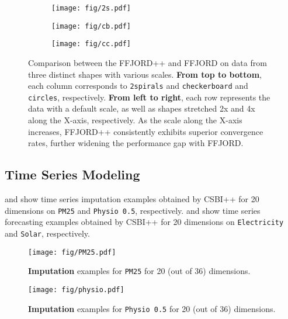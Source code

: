 \begin{figure}[!t]
    \centering
    \begin{subfigure}[b]{0.9\textwidth}
        \centering
        \texttt{[image: fig/2s.pdf]}
    \end{subfigure}
    \begin{subfigure}[b]{0.9\textwidth}
        \centering
        \texttt{[image: fig/cb.pdf]}
    \end{subfigure}
    \begin{subfigure}[b]{0.9\textwidth}
        \centering
        \texttt{[image: fig/cc.pdf]}
    \end{subfigure}

    \caption{\small Comparison between the FFJORD++ and FFJORD on data from three distinct shapes with various scales. \textbf{From top to bottom}, each column corresponds to \texttt{2spirals} and \texttt{checkerboard} and \texttt{circles}, respectively. \textbf{From left to right}, each row represents the data with a default scale, as well as shapes stretched 2x and 4x along the X-axis, respectively. As the scale along the X-axis increases, FFJORD++ consistently exhibits superior convergence rates, further widening the performance gap with FFJORD.}

    \label{fig: ap_condition_num}
\end{figure}

\subsection{Time Series Modeling}
 and  show time series imputation examples obtained by CSBI++ for 20 dimensions on \texttt{PM25} and \texttt{Physio 0.5}, respectively.
 and  show time series forecasting examples obtained by CSBI++ for 20 dimensions on \texttt{Electricity} and \texttt{Solar}, respectively.

\begin{figure}[!t]
    \centering
    \texttt{[image: fig/PM25.pdf]}
    \caption{\small \textbf{Imputation} examples for \texttt{PM25} for 20 (out of 36) dimensions.}
    \label{fig: ap_im_pm25}
\end{figure}
\begin{figure}[!t]
    \centering
    \texttt{[image: fig/physio.pdf]}
    \caption{\small \textbf{Imputation} examples for \texttt{Physio 0.5} for 20 (out of 36) dimensions.}
    \label{fig: ap_im_phy}
\end{figure}

